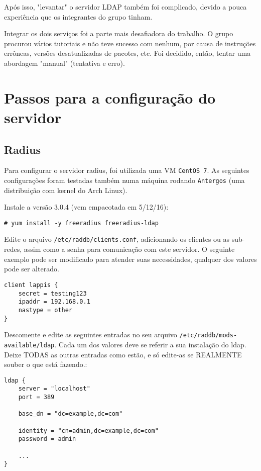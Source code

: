 Após isso, "levantar" o servidor LDAP também foi complicado, devido a pouca
experiência que os integrantes do grupo tinham.


Integrar os dois serviços foi a parte mais desafiadora do trabalho. O grupo procurou
vários tutoriais e não teve sucesso com nenhum, por causa de instruções errôneas,
versões desatualizadas de pacotes, etc. Foi decidido, então, tentar uma abordagem
"manual" (tentativa e erro).

\section{Passos para a configuração do servidor}

\subsection{Radius}
Para configurar o servidor radius, foi utilizada uma VM \verb|CentOS 7|. As seguintes
configurações foram testadas também numa máquina rodando \verb|Antergos| (uma distribuição
com kernel do Arch Linux). 

Instale a versão 3.0.4 (vem empacotada em 5/12/16):
\begin{verbatim}
# yum install -y freeradius freeradius-ldap
\end{verbatim}

Edite o arquivo \verb|/etc/raddb/clients.conf|, adicionando os clientes ou as sub-redes,
assim como a senha para comunicação com este servidor. O seguinte exemplo pode ser modificado
para atender suas necessidades, qualquer dos valores pode ser alterado.

\begin{verbatim}
client lappis {
    secret = testing123
    ipaddr = 192.168.0.1
    nastype = other
}
\end{verbatim}

Descomente e edite as seguintes entradas no seu arquivo \verb|/etc/raddb/mods-available/ldap|.
Cada um dos valores deve se referir a sua instalação do ldap. Deixe TODAS as outras
entradas como estão, e só edite-as se REALMENTE souber o que está fazendo.:

\begin{verbatim}
ldap {
    server = "localhost"
    port = 389

    base_dn = "dc=example,dc=com"

    identity = "cn=admin,dc=example,dc=com"
    password = admin

    ...
}
\end{verbatim}

